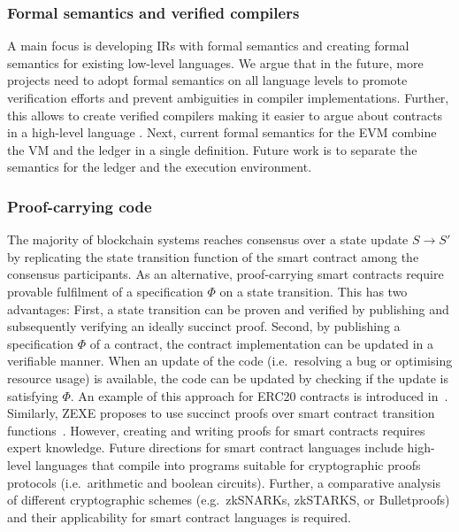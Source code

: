 \subsubsection{Formal semantics and verified compilers}
A main focus is developing IRs with formal semantics and creating formal semantics for existing low-level languages. We argue that in the future, more projects need to adopt formal semantics on all language levels to promote verification efforts and prevent ambiguities in compiler implementations. Further, this allows to create verified compilers making it easier to argue about contracts in a high-level language \cite{Hirai2017}. 
Next, current formal semantics for the EVM combine the VM and the ledger in a single definition. 
Future work is to separate the semantics for the ledger and the execution environment. 



\subsubsection{Proof-carrying code}
The majority of blockchain systems reaches consensus over a state update $S \rightarrow S'$ by replicating the state transition function of the smart contract among the consensus participants. 
As an alternative, proof-carrying smart contracts require provable fulfilment of a specification $\Phi$ on a state transition. 
This has two advantages: First, a state transition can be proven and verified by publishing and subsequently verifying an ideally succinct proof. 
Second, by publishing a specification $\Phi$ of a contract, the contract implementation can be updated in a verifiable manner.
When an update of the code (i.e.\ resolving a bug or optimising resource usage) is available, the code can be updated by checking if the update is satisfying $\Phi$.
An example of this approach for ERC20 contracts is introduced in~\cite{Dickerson2018}.
Similarly, ZEXE proposes to use succinct proofs over smart contract transition functions~\cite{Bowe2018}.
However, creating and writing proofs for smart contracts requires expert knowledge.
Future directions for smart contract languages include high-level languages that compile into programs suitable for cryptographic proofs protocols (i.e.\ arithmetic and boolean circuits).
Further, a comparative analysis of different cryptographic schemes (e.g.\ zkSNARKs, zkSTARKS, or Bulletproofs) and their applicability for smart contract languages is required.


